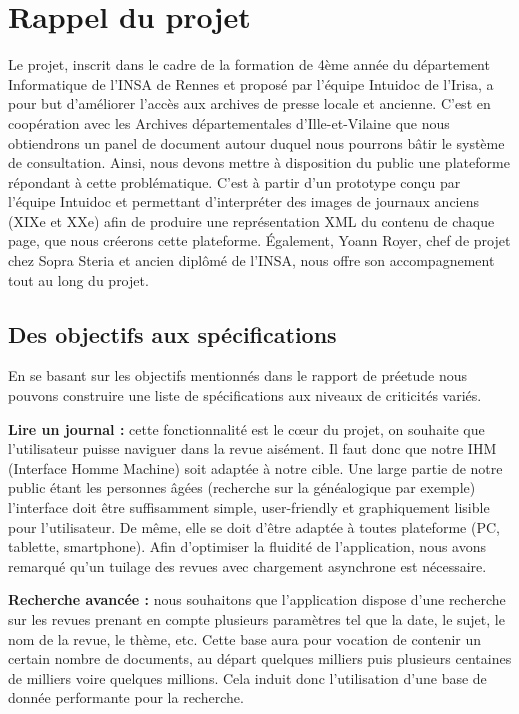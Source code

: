 \section{Rappel du projet}
\label{sec:rapp}

Le projet, inscrit dans le cadre de la formation de 4ème année du département Informatique de l’INSA de Rennes et proposé par l’équipe Intuidoc de l’Irisa, a pour but d’améliorer l’accès aux archives de presse locale et ancienne. C’est en coopération avec les Archives départementales d’Ille-et-Vilaine que nous obtiendrons un panel de document autour duquel nous pourrons bâtir le système de consultation. Ainsi, nous devons mettre à disposition du public une plateforme répondant à cette problématique.
C’est à partir d’un prototype conçu par l’équipe Intuidoc et permettant d’interpréter des images de journaux anciens (XIXe et XXe) afin de produire une représentation XML du contenu de chaque page, que nous créerons cette plateforme.
Également, Yoann Royer, chef de projet chez Sopra Steria et ancien diplômé de l’INSA, nous offre son accompagnement tout au long du projet. 

	\subsection{Des objectifs aux spécifications}
	\label{sec:objectifs}
	En se basant sur les objectifs mentionnés dans le rapport de préetude nous pouvons construire une liste de spécifications aux niveaux de criticités variés.
	

	\textbf{Lire un journal :} cette fonctionnalité est le cœur du projet, on souhaite que l’utilisateur puisse naviguer dans la revue aisément. Il faut donc que notre IHM (Interface Homme Machine) soit adaptée à notre cible. Une large partie de notre public étant les personnes âgées (recherche sur la généalogique par exemple) l’interface doit être suffisamment simple, user-friendly et graphiquement lisible pour l’utilisateur. De même, elle se doit d’être adaptée à toutes plateforme (PC, tablette, smartphone). Afin d’optimiser la fluidité de l’application, nous avons remarqué qu’un tuilage des revues avec chargement asynchrone est nécessaire. %
	

	\textbf{Recherche avancée :} nous souhaitons que l’application dispose d’une recherche sur les revues prenant en compte plusieurs paramètres tel que la date, le sujet, le nom de la revue, le thème, etc. Cette base aura pour vocation de contenir un certain nombre de documents, au départ quelques milliers puis plusieurs centaines de milliers voire quelques millions. Cela induit donc l’utilisation d’une base de donnée performante pour la recherche.
	


